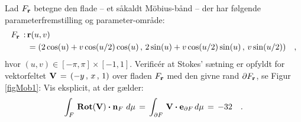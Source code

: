 \begin{exercise} \label{exercMob1}
Lad $F_{\bf{r}}$ betegne den flade  -- et såkaldt M\"{o}bius-bånd -- der har
følgende parameterfremstilling og
parameter-område:
\begin{equation}
\begin{aligned}
F_{\bf{r}}\, : \, &{\bf{r}}(u,v)\, \\
&= (2\cos(u)+v\cos(u/2)\cos(u)\, , \,  2\sin(u)+v\cos(u/2)\sin(u)\, , \, v\sin(u/2))
\quad ,
\end{aligned}
\end{equation}
hvor $(u, v) \in [-\pi, \pi] \times [-1, 1]$.
Verific\'{e}r at Stokes' sætning er opfyldt for
vektorfeltet ${\bf{V}}\, = \, (-y\,, \,x\,,
\,1)$ over fladen $F_{\bf{r}}$ med den givne
rand $\partial F_{\bf{r}}$, se Figur \ref{figMob1}: Vis eksplicit, at der
gælder:
\begin{equation} \label{eqMob1}
\int_{F}\, \operatorname{\mathbf{Rot}}({\bf{V}})\bm{\cdot} {\bf{n}}_{F} \,
\,d\mu \, = \, \int_{\partial F} \, {\bf{V}}
\bm{\cdot} {\bf{e}}_{\partial F} \, d\mu \, = \, -32 \quad .
\end{equation}
\end{exercise}

